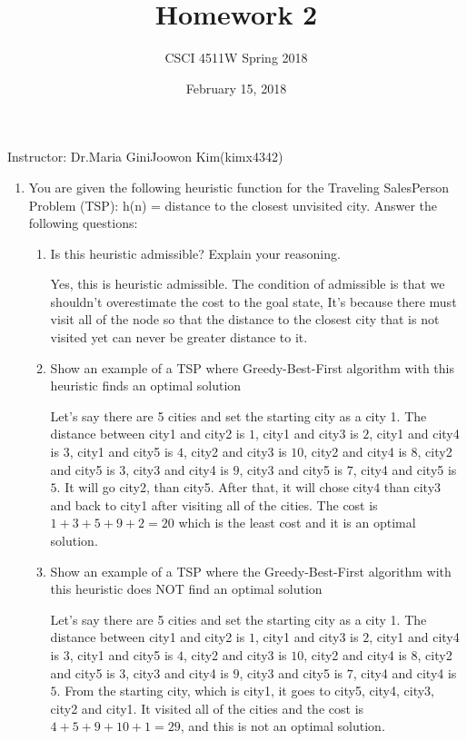 \documentclass[12pt]{article}
\title{Homework 2}
\author{CSCI 4511W Spring 2018}
\begin{document}
\date{February 15, 2018}
\maketitle

Instructor: Dr.Maria Gini\hfill Joowon Kim(kimx4342)

\hrulefill

\begin{enumerate}
\item You are given the following heuristic function for the Traveling SalesPerson Problem (TSP): h(n) = distance to the closest unvisited city. Answer the following questions:
  \begin{enumerate}
  \item Is this heuristic admissible? Explain your reasoning. \par
  
  Yes, this is heuristic admissible. The condition of admissible is that we shouldn't overestimate the cost to the goal state, It's because there must visit all of the node so that the distance to the closest city that is not visited yet can never be greater distance to it.
  
  \item Show an example of a TSP where Greedy-Best-First algorithm with this heuristic finds an optimal solution \par
  
  Let's say there are 5 cities and set the starting city as a city 1. The distance between city1 and city2 is $1$, city1 and city3 is $2$, city1 and city4 is $3$, city1 and city5 is $4$, city2 and city3 is $10$, city2 and city4 is $8$, city2 and city5 is $3$, city3 and city4 is $9$, city3 and city5 is $7$, city4 and city5 is $5$. It will go city2, than city5. After that, it will chose city4 than city3 and back to city1 after visiting all of the cities. The cost is $1+3+5+9+2=20$ which is the least cost and it is an optimal solution. 
  
  \item Show an example of a TSP where the Greedy-Best-First algorithm with this heuristic does NOT find an optimal solution \par
  
   Let's say there are 5 cities and set the starting city as a city 1. The distance between city1 and city2 is $1$, city1 and city3 is $2$, city1 and city4 is $3$, city1 and city5 is $4$, city2 and city3 is $10$, city2 and city4 is $8$, city2 and city5 is $3$, city3 and city4 is $9$, city3 and city5 is $7$, city4 and city4 is $5$. From the starting city, which is city1, it goes to city5, city4, city3, city2 and city1. It visited all of the cities and the cost is $4+5+9+10+1 = 29$, and this is not an optimal solution. 
  

\end{enumerate}
\end{enumerate}
\end{document}
